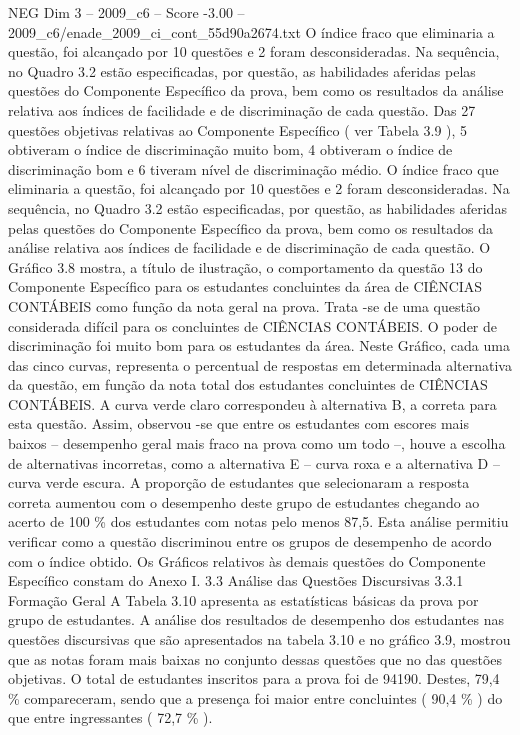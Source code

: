 \begin{textsample}{NEG Dim 3 – 2009\_c6 – Score -3.00 – 2009\_c6/enade\_2009\_ci\_cont\_55d90a2674.txt}
O índice fraco que eliminaria a questão, foi alcançado por 10 questões e 2 foram desconsideradas.
Na sequência, no Quadro 3.2 estão especificadas, por questão, as habilidades aferidas pelas questões do Componente Específico da prova, bem como os resultados da análise relativa aos índices de facilidade e de discriminação de cada questão.
Das 27 questões objetivas relativas ao Componente Específico ( ver Tabela 3.9 ), 5 obtiveram o índice de discriminação muito bom, 4 obtiveram o índice de discriminação bom e 6 tiveram nível de discriminação médio.
O índice fraco que eliminaria a questão, foi alcançado por 10 questões e 2 foram desconsideradas.
Na sequência, no Quadro 3.2 estão especificadas, por questão, as habilidades aferidas pelas questões do Componente Específico da prova, bem como os resultados da análise relativa aos índices de facilidade e de discriminação de cada questão.
O Gráfico 3.8 mostra, a título de ilustração, o comportamento da questão 13 do Componente Específico para os estudantes concluintes da área de CIÊNCIAS CONTÁBEIS como função da nota geral na prova.
Trata -se de uma questão considerada difícil para os concluintes de CIÊNCIAS CONTÁBEIS.
O poder de discriminação foi muito bom para os estudantes da área.
Neste Gráfico, cada uma das cinco curvas, representa o percentual de respostas em determinada alternativa da questão, em função da nota total dos estudantes concluintes de CIÊNCIAS CONTÁBEIS.
A curva verde claro correspondeu à alternativa B, a correta para esta questão.
Assim, observou -se que entre os estudantes com escores mais baixos – desempenho geral mais fraco na prova como um todo –, houve a escolha de alternativas incorretas, como a alternativa E – curva roxa e a alternativa D – curva verde escura.
A proporção de estudantes que selecionaram a resposta correta aumentou com o desempenho deste grupo de estudantes chegando ao acerto de 100 \% dos estudantes com notas pelo menos 87,5.
Esta análise permitiu verificar como a questão discriminou entre os grupos de desempenho de acordo com o índice obtido.
Os Gráficos relativos às demais questões do Componente Específico constam do Anexo I. 3.3 Análise das Questões Discursivas 3.3.1 Formação Geral A Tabela 3.10 apresenta as estatísticas básicas da prova por grupo de estudantes.
A análise dos resultados de desempenho dos estudantes nas questões discursivas que são apresentados na tabela 3.10 e no gráfico 3.9, mostrou que as notas foram mais baixas no conjunto dessas questões que no das questões objetivas.
O total de estudantes inscritos para a prova foi de 94190.
Destes, 79,4 \% compareceram, sendo que a presença foi maior entre concluintes ( 90,4 \% ) do que entre ingressantes ( 72,7 \% ).

\end{textsample}
